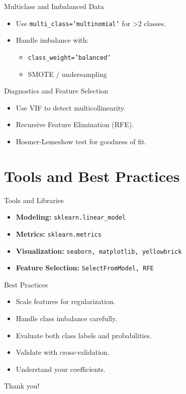 \documentclass{beamer}
\begin{document}
\begin{frame}{Multiclass and Imbalanced Data}
\begin{itemize}
  \item Use \texttt{multi\_class='multinomial'} for >2 classes.
  \item Handle imbalance with:
  \begin{itemize}
    \item \texttt{class\_weight='balanced'}
    \item SMOTE / undersampling
  \end{itemize}
\end{itemize}
\end{frame}

\begin{frame}{Diagnostics and Feature Selection}
\begin{itemize}
  \item Use VIF to detect multicollinearity.
  \item Recursive Feature Elimination (RFE).
  \item Hosmer-Lemeshow test for goodness of fit.
\end{itemize}
\end{frame}

\section{Tools and Best Practices}

\begin{frame}{Tools and Libraries}
\begin{itemize}
  \item \textbf{Modeling:} \texttt{sklearn.linear\_model}
  \item \textbf{Metrics:} \texttt{sklearn.metrics}
  \item \textbf{Visualization:} \texttt{seaborn, matplotlib, yellowbrick}
  \item \textbf{Feature Selection:} \texttt{SelectFromModel, RFE}
\end{itemize}
\end{frame}

\begin{frame}{Best Practices}
\begin{itemize}
  \item Scale features for regularization.
  \item Handle class imbalance carefully.
  \item Evaluate both class labels and probabilities.
  \item Validate with cross-validation.
  \item Understand your coefficients.
\end{itemize}
\end{frame}


\begin{frame}[standout]
    Thank you!
\end{frame}
\end{document}
